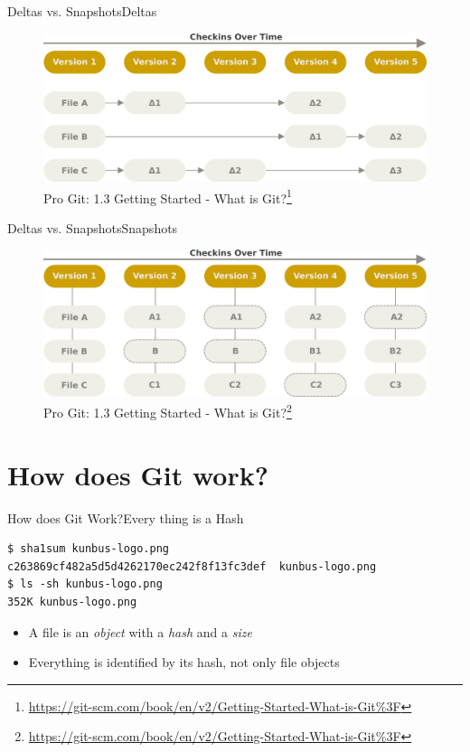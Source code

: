 \documentclass[aspectratio=169]{beamer}
\begin{document}
\begin{frame}{Deltas vs. Snapshots}{Deltas}
\begin{figure}
	\centering
	\includegraphics[width=1\textwidth]{deltas}
	\caption{
		Pro Git: 1.3 Getting Started - What is Git?\footnote{\url{https://git-scm.com/book/en/v2/Getting-Started-What-is-Git\%3F}}
	}
\end{figure}
\end{frame}

\begin{frame}{Deltas vs. Snapshots}{Snapshots}
\begin{figure}
	\centering
	\includegraphics[width=1\textwidth]{snapshots}
	\caption{
		Pro Git: 1.3 Getting Started - What is Git?\footnote{\url{https://git-scm.com/book/en/v2/Getting-Started-What-is-Git\%3F}}
	}
\end{figure}
\end{frame}

\section{How does Git work?}
\begin{frame}[fragile]{How does Git Work?}{Every thing is a Hash}
\begin{verbatim}
$ sha1sum kunbus-logo.png 
c263869cf482a5d5d4262170ec242f8f13fc3def  kunbus-logo.png
$ ls -sh kunbus-logo.png 
352K kunbus-logo.png
\end{verbatim}
\begin{itemize}
	\item A file is an \emph{object} with a \emph{hash} and a \emph{size}
	\item Everything is identified by its hash, not only file objects
\end{itemize}
\end{frame}
\end{document}
